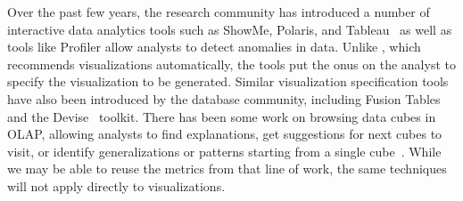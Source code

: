 

Over the past few years, the research community has introduced 
a number of interactive data analytics tools such as ShowMe, Polaris, and
Tableau~\cite{DBLP:journals/cacm/StolteTH08, DBLP:journals/tvcg/MackinlayHS07}
as well as tools like Profiler allow analysts to detect anomalies in data.
Unlike \SeeDB, which recommends visualizations automatically, the tools put the
onus on the analyst to specify the visualization to be generated.
Similar visualization specification tools have also been introduced
by the database community, including Fusion Tables~\cite{DBLP:conf/sigmod/GonzalezHJLMSSG10} 
and the Devise~\cite{DBLP:conf/sigmod/LivnyRBCDLMW97} toolkit.
There has been some work on browsing data cubes in OLAP, allowing
analysts to find explanations, get suggestions for next cubes to visit,
or identify generalizations or patterns starting from a single cube~\cite{DBLP:conf/vldb/Sarawagi99, 
DBLP:conf/vldb/SatheS01, DBLP:conf/vldb/Sarawagi00}. 
While we may be able to reuse the metrics from that line of work,
the same techniques will not apply directly to visualizations.



